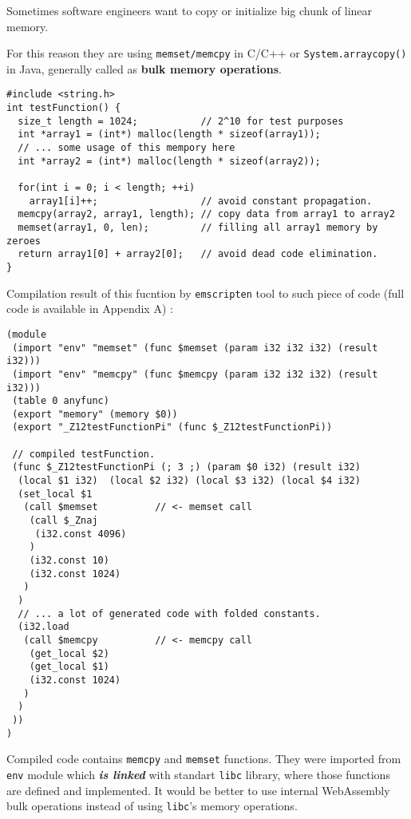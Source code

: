 Sometimes software engineers want to copy or initialize big chunk of linear memory.

For this reason they are using \texttt{memset/memcpy} in C/C++ or \texttt{System.arraycopy()} in Java, generally called as \textbf{bulk memory operations}. 

\begin{verbatim}
#include <string.h>
int testFunction() {
  size_t length = 1024;           // 2^10 for test purposes 
  int *array1 = (int*) malloc(length * sizeof(array1));
  // ... some usage of this mempory here
  int *array2 = (int*) malloc(length * sizeof(array2));
  
  for(int i = 0; i < length; ++i)
    array1[i]++;                  // avoid constant propagation. 
  memcpy(array2, array1, length); // copy data from array1 to array2 
  memset(array1, 0, len);         // filling all array1 memory by zeroes 
  return array1[0] + array2[0];   // avoid dead code elimination.
}
\end{verbatim}

Compilation result of this fucntion by \texttt{emscripten} tool to such piece of code (full code is available in Appendix A) :
\small
\begin{verbatim}
(module
 (import "env" "memset" (func $memset (param i32 i32 i32) (result i32)))
 (import "env" "memcpy" (func $memcpy (param i32 i32 i32) (result i32)))
 (table 0 anyfunc)
 (export "memory" (memory $0))
 (export "_Z12testFunctionPi" (func $_Z12testFunctionPi))

 // compiled testFunction.
 (func $_Z12testFunctionPi (; 3 ;) (param $0 i32) (result i32)
  (local $1 i32)  (local $2 i32) (local $3 i32) (local $4 i32)
  (set_local $1
   (call $memset          // <- memset call
    (call $_Znaj
     (i32.const 4096)
    )
    (i32.const 10)
    (i32.const 1024)
   )
  )
  // ... a lot of generated code with folded constants.
  (i32.load
   (call $memcpy          // <- memcpy call
    (get_local $2)
    (get_local $1)
    (i32.const 1024)
   )
  )
 ))
)
\end{verbatim}

\normalsize

Compiled code contains \texttt{memcpy} and \texttt{memset} functions.
They were imported from \texttt{env} module which \textbf{\textit{is linked}} with standart \texttt{libc} library, where those functions are defined and implemented.
It would be better to use internal WebAssembly bulk operations instead of using \texttt{libc}'s memory operations. 

